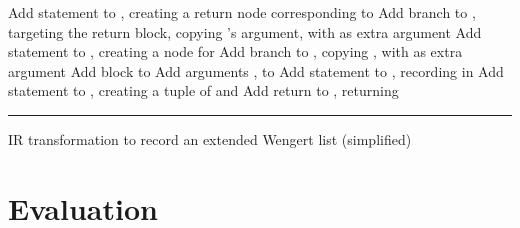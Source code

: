 \begin{algorithm}[p]
\begin{algorithmic}
    \State Add statement  to , creating a return node
    corresponding to 
    \State Add branch to , targeting the return block, copying 's
    argument, with  as extra argument
    \Else
    \State Add statement  to , creating a node for 
    \State Add branch to , copying , with  as
    extra argument
    \EndIf
    \EndFor
    \EndFor
    \Statex
    \State Add block  to 
    \State Add arguments ,  to 
    \State Add statement to , recording  in
    \State Add statement  to , creating a tuple of
     and 
    \State Add return to , returning 
    \EndFunction
  \end{algorithmic}
  \smallskip
  \hrule
  \caption{IR transformation to record an extended Wengert list (simplified) \label{alg:ir-transform}}
\end{algorithm}




\section{Evaluation}
\label{sec:irtracker-eval}

